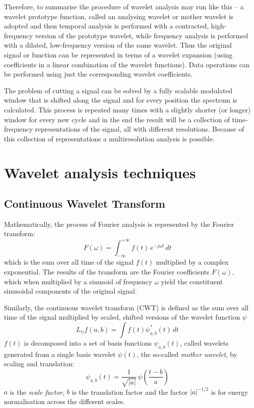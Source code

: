 \documentclass[a4paper,11pt]{report}
\begin{document}
Therefore, to summarise the procedure of wavelet analysis may run like this -- a wavelet prototype function, called an analysing wavelet or mother wavelet is adopted and then temporal analysis is performed with a contracted, high-frequency version of the prototype wavelet, while frequency analysis is performed with a dilated, low-frequency version of the same wavelet. Thus the original signal or function can be represented in terms of a wavelet expansion (using coefficients in a linear combination of the wavelet functions). Data operations can be performed using just the corresponding wavelet coefficients.

The problem of cutting a signal can be solved by a fully scalable modulated window that is shifted along the signal and for every position the spectrum is calculated. This process is repeated many times with a slightly shorter (or longer) window for every new cycle and in the end the result will be a collection of time-frequency representations of the signal, all with different resolutions. Because of this collection of representations a multiresolution analysis is possible.

\section{Wavelet analysis techniques}
\subsection{Continuous Wavelet Transform}
Mathematically, the process of Fourier analysis is represented by the Fourier transform:
\begin{equation} \label{ft}
F(\omega) = \int_{-\infty}^{+\infty} f(t)\,e^{-j\omega t}\,dt
\end{equation}
which is the sum over all time of the signal $f(t)$ multiplied by a complex exponential. The results of the transform are the Fourier coefficients $F(\omega)$, which when multiplied by a sinusoid of frequency $\omega$ yield the constituent sinusoidal components of the original signal.

Similarly, the continuous wavelet transform (CWT) is defined as the sum over all time of the signal multiplied by scaled, shifted versions of the wavelet function $\psi$ \cite{daub}
\begin{equation} \label{cwt}
L_{\psi}f(a,b) = \int f(t)\psi^{\ast}_{a,b}(t)\,dt
\end{equation}
$f(t)$ is decomposed into a set of basis functions $\psi_{a,b}(t)$, called wavelets generated from a single basic wavelet $\psi(t)$, the so-called \emph{mother wavelet}, by scaling and translation:
\begin{displaymath}
\psi_{a,b}(t) = \frac{1}{\sqrt{|a|}} \, \psi \left( \frac{t - b}{a} \right)
\end{displaymath}
$a$ is the \emph{scale factor}, $b$ is the translation factor and the factor $|a|^{-1/2}$ is for energy normalisation across the different scales.
\end{document}
